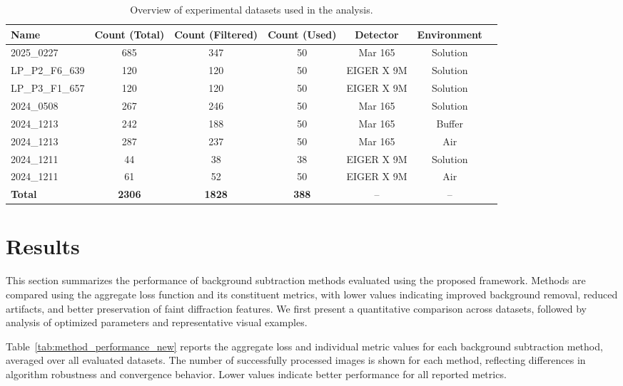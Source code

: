 \documentclass[iucr,review]{iucrjournals}
\begin{document}
\begin{table}[t]
\caption{Overview of experimental datasets used in the analysis.}
\label{tab:datasets}
\centering
\small
\setlength{\tabcolsep}{4pt}
\renewcommand{\arraystretch}{1.0}
\begin{tabular}{@{}lcccccc@{}}
\toprule
Name & Count (Total) & Count (Filtered) & Count (Used) & Detector & Environment \\ \midrule
2025\_0227 & 685 & 347 & 50 & Mar 165 & Solution \\
LP\_P2\_F6\_639 & 120 & 120 & 50 & EIGER X 9M & Solution \\
LP\_P3\_F1\_657 & 120 & 120 & 50 & EIGER X 9M & Solution \\
2024\_0508 & 267 & 246 & 50 & Mar 165 & Solution \\
2024\_1213 & 242 & 188 & 50 & Mar 165 & Buffer \\
2024\_1213 & 287 & 237 & 50 & Mar 165 & Air \\
2024\_1211 & 44 & 38 & 38 & EIGER X 9M & Solution \\
2024\_1211 & 61 & 52 & 50 & EIGER X 9M & Air \\ \midrule
\textbf{Total} & \textbf{2306} & \textbf{1828} & \textbf{388} & -- & -- \\
\bottomrule
\end{tabular}
\end{table}



\section{Results}

This section summarizes the performance of background subtraction methods evaluated using the proposed framework. Methods are compared using the aggregate loss function and its constituent metrics, with lower values indicating improved background removal, reduced artifacts, and better preservation of faint diffraction features. We first present a quantitative comparison across datasets, followed by analysis of optimized parameters and representative visual examples.

Table~\ref{tab:method_performance_new} reports the aggregate loss and individual metric values for each background subtraction method, averaged over all evaluated datasets. The number of successfully processed images is shown for each method, reflecting differences in algorithm robustness and convergence behavior. Lower values indicate better performance for all reported metrics.
\end{document}
